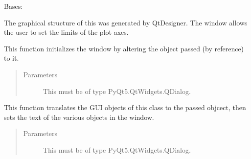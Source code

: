 \documentclass[letterpaper,10pt,english]{sphinxmanual}
\begin{document}
\begin{fulllineitems}
\label{\detokenize{scaleAxesGUI:scaleAxesGUI.Ui_Dialog}}
Bases: 

The graphical structure of this  was generated by QtDesigner.
The window allows the user to set the limits of the plot axes.

\begin{fulllineitems}
\label{\detokenize{scaleAxesGUI:scaleAxesGUI.Ui_Dialog.setupUi}}
This function initializes the window by altering the  object passed (by reference) to it.
\begin{quote}\begin{description}
\item[{Parameters}] \leavevmode
{} \textendash{} This must be of type PyQt5.QtWidgets.QDialog.

\end{description}\end{quote}

\end{fulllineitems}


\begin{fulllineitems}
\label{\detokenize{scaleAxesGUI:scaleAxesGUI.Ui_Dialog.retranslateUi}}
This function translates the GUI objects of this class to the passed  objcect,
then sets the text of the various objects in the window.
\begin{quote}\begin{description}
\item[{Parameters}] \leavevmode
{} \textendash{} This must be of type PyQt5.QtWidgets.QDialog.

\end{description}\end{quote}


\end{fulllineitems}
\end{fulllineitems}
\end{document}
